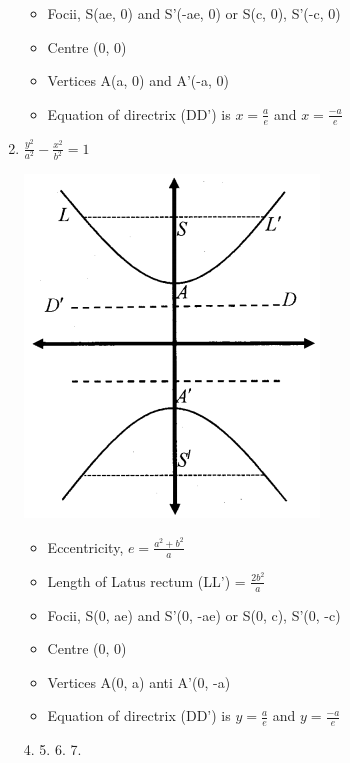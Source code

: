 \documentclass[12pt]{article}
\begin{document}
\begin{multicols}{2}
\begin{enumerate}
\begin{itemize}
        \item Focii, S(ae, 0) and S'(-ae, 0) or S(c, 0), S'(-c, 0)
        \item Centre (0, 0)
        \item Vertices A(a, 0) and A'(-a, 0)
        \item Equation of directrix (DD’) is $x = \frac{a}{e}$ and $x = \frac{-a}{e}$
    \end{itemize}
    \item $\frac{y^{2}}{a^{2}}-\frac{x^{2}}{b^{2}}=1$ \begin{center}
        \includegraphics[scale =0.7]{8.png}
    \end{center}
    \begin{itemize}
        \item Eccentricity, $e = \frac{a^2+b^2}{a}$
        \item Length of Latus rectum (LL’) = $\frac{2b^2}{a}$
        \item Focii, S(0, ae) and S'(0, -ae) or S(0, c), S'(0, -c)
        \item Centre (0, 0)
        \item Vertices A(0, a) anti A'(0, -a)
        \item Equation of directrix (DD’) is $y =\frac{a}{e}$  and $y = \frac{-a}{e}$
    \end{itemize}
    4. 
    5. 
    6. 
    7. 
\end{enumerate}
\end{multicols}
\end{document}
